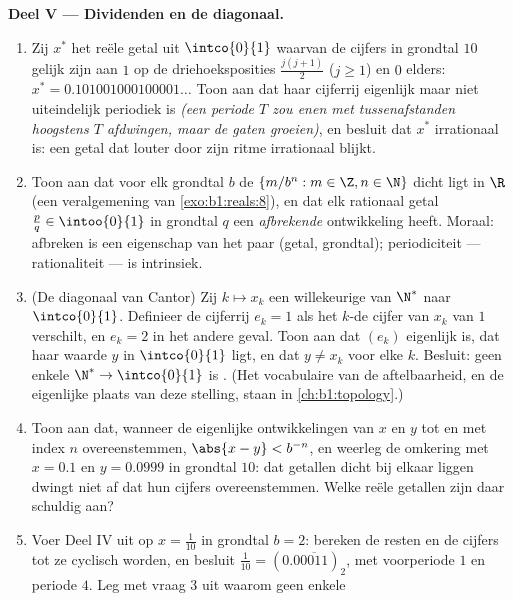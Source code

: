 \begin{problem}
\medskip
\noindent\textbf{Deel V --- Dividenden en de diagonaal.}
\begin{enumerate}[resume]
  \item Zij $x^*$ het reële getal uit $\intco{0}{1}$ waarvan de cijfers
        in grondtal $10$ gelijk zijn aan $1$ op de driehoeksposities
        $\frac{j(j + 1)}{2}$ ($j \geq 1$) en $0$ elders: $x^* =
        0.101001000100001\dots$ Toon aan dat haar cijferrij eigenlijk
        maar niet uiteindelijk periodiek is \emph{(een periode $T$ zou
        enen met tussenafstanden hoogstens $T$ afdwingen, maar de gaten
        groeien)}, en besluit dat $x^*$ irrationaal is: een getal dat
        louter door zijn ritme irrationaal blijkt.
  \item Toon aan dat voor elk grondtal $b$ de  $\{m/b^n : m
        \in \Z, n \in \N\}$ dicht ligt in $\R$ (een veralgemening van
        \cref{exo:b1:reals:8}), en dat elk rationaal getal $\frac pq \in
        \intoo{0}{1}$ in grondtal $q$ een \emph{afbrekende} ontwikkeling
        heeft. Moraal: afbreken is een eigenschap van het paar (getal,
        grondtal); periodiciteit --- rationaliteit --- is intrinsiek.
  \item (De diagonaal van Cantor) Zij $k \mapsto x_k$ een willekeurige
         van $\N^*$ naar $\intco{0}{1}$. Definieer de
        cijferrij $e_k = 1$ als het $k$-de cijfer van $x_k$ van $1$
        verschilt, en $e_k = 2$ in het andere geval. Toon aan dat
        $(e_k)$ eigenlijk is, dat haar waarde $y$ in $\intco{0}{1}$
        ligt, en dat $y \neq x_k$ voor elke $k$. Besluit: geen enkele
         $\N^* \to \intco{0}{1}$ is . (Het
        vocabulaire van de aftelbaarheid, en de eigenlijke plaats van
        deze stelling, staan in \cref{ch:b1:topology}.)
  \item Toon aan dat, wanneer de eigenlijke ontwikkelingen van $x$ en
        $y$ tot en met index $n$ overeenstemmen, $\abs{x - y} < b^{-n}$,
        en weerleg de omkering met $x = 0.1$ en $y = 0.0999$ in grondtal
        $10$: dat getallen dicht bij elkaar liggen dwingt niet af dat
        hun cijfers overeenstemmen. Welke reële getallen zijn daar
        schuldig aan?
  \item Voer Deel IV uit op $x = \frac{1}{10}$ in grondtal $b = 2$:
        bereken de resten en de cijfers tot ze cyclisch worden, en
        besluit $\frac{1}{10} = (0.0\overline{0011})_2$, met voorperiode
        $1$ en periode $4$. Leg met vraag 3 uit waarom geen enkele

\end{enumerate}
\end{problem}
